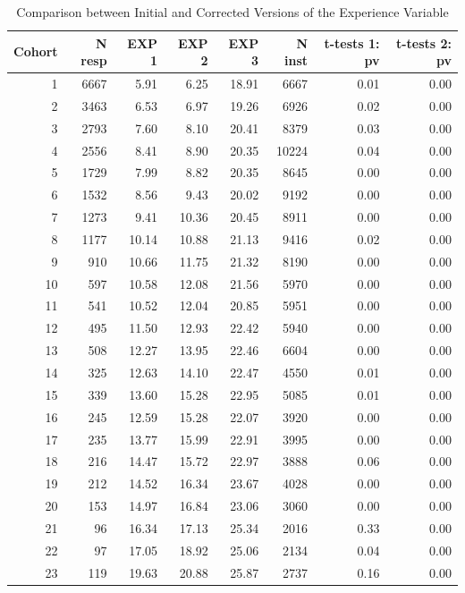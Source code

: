 \documentclass[12pt,a4paper]{article}
\begin{document}
\begin{table}[H]
        \centering
        \caption{Comparison between Initial and Corrected Versions of the Experience Variable}
        \label{tab:1}
\begin{tabular}{rrrrrrrr}
  \hline
Cohort & N resp & EXP 1 & EXP 2 & EXP 3 & N inst & t-tests 1: pv & t-tests 2: pv \\ 
  \hline
  1 & 6667 & 5.91 & 6.25 & 18.91 & 6667 & 0.01 & 0.00 \\ 
    2 & 3463 & 6.53 & 6.97 & 19.26 & 6926 & 0.02 & 0.00 \\ 
    3 & 2793 & 7.60 & 8.10 & 20.41 & 8379 & 0.03 & 0.00 \\ 
    4 & 2556 & 8.41 & 8.90 & 20.35 & 10224 & 0.04 & 0.00 \\ 
    5 & 1729 & 7.99 & 8.82 & 20.35 & 8645 & 0.00 & 0.00 \\ 
    6 & 1532 & 8.56 & 9.43 & 20.02 & 9192 & 0.00 & 0.00 \\ 
    7 & 1273 & 9.41 & 10.36 & 20.45 & 8911 & 0.00 & 0.00 \\ 
    8 & 1177 & 10.14 & 10.88 & 21.13 & 9416 & 0.02 & 0.00 \\ 
    9 & 910 & 10.66 & 11.75 & 21.32 & 8190 & 0.00 & 0.00 \\ 
   10 & 597 & 10.58 & 12.08 & 21.56 & 5970 & 0.00 & 0.00 \\ 
   11 & 541 & 10.52 & 12.04 & 20.85 & 5951 & 0.00 & 0.00 \\ 
   12 & 495 & 11.50 & 12.93 & 22.42 & 5940 & 0.00 & 0.00 \\ 
   13 & 508 & 12.27 & 13.95 & 22.46 & 6604 & 0.00 & 0.00 \\ 
   14 & 325 & 12.63 & 14.10 & 22.47 & 4550 & 0.01 & 0.00 \\ 
   15 & 339 & 13.60 & 15.28 & 22.95 & 5085 & 0.01 & 0.00 \\ 
   16 & 245 & 12.59 & 15.28 & 22.07 & 3920 & 0.00 & 0.00 \\ 
   17 & 235 & 13.77 & 15.99 & 22.91 & 3995 & 0.00 & 0.00 \\ 
   18 & 216 & 14.47 & 15.72 & 22.97 & 3888 & 0.06 & 0.00 \\ 
   19 & 212 & 14.52 & 16.34 & 23.67 & 4028 & 0.00 & 0.00 \\ 
   20 & 153 & 14.97 & 16.84 & 23.06 & 3060 & 0.00 & 0.00 \\ 
   21 &  96 & 16.34 & 17.13 & 25.34 & 2016 & 0.33 & 0.00 \\ 
   22 &  97 & 17.05 & 18.92 & 25.06 & 2134 & 0.04 & 0.00 \\ 
   23 & 119 & 19.63 & 20.88 & 25.87 & 2737 & 0.16 & 0.00 \\ 
   \hline
\end{tabular}\end{table}
\end{document}
